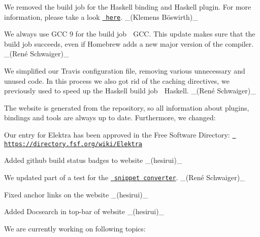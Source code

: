 \begin{DoxyItemize}
\item We removed the build job for the Haskell binding and Haskell plugin. For more information, please take a look \href{https://issues.libelektra.org/2751}{\texttt{ here}}. \+\_\+(Klemens Böswirth)\+\_\+
\item We always use G\+CC 9 for the build job {\ttfamily 🍏 G\+CC}. This update makes sure that the build job succeeds, even if Homebrew adds a new major version of the compiler. \+\_\+(René Schwaiger)\+\_\+
\item We simplified our Travis configuration file, removing various unnecessary and unused code. In this process we also got rid of the caching directives, we previously used to speed up the Haskell build job {\ttfamily 🍏 Haskell}. \+\_\+(René Schwaiger)\+\_\+
\end{DoxyItemize}

The website is generated from the repository, so all information about plugins, bindings and tools are always up to date. Furthermore, we changed\+:


\begin{DoxyItemize}
\item Our entry for Elektra has been approved in the Free Software Directory\+: \href{https://directory.fsf.org/wiki/Elektra}{\texttt{ https\+://directory.\+fsf.\+org/wiki/\+Elektra}}
\item Added github build status badges to website \+\_\+(hesirui)\+\_\+
\item We updated part of a test for the \href{https://www.libelektra.org/conversion}{\texttt{ snippet converter}}. \+\_\+(René Schwaiger)\+\_\+
\item Fixed anchor links on the website \+\_\+(hesirui)\+\_\+
\item Added Docsearch in top-\/bar of website \+\_\+(hesirui)\+\_\+
\end{DoxyItemize}

We are currently working on following topics\+:


